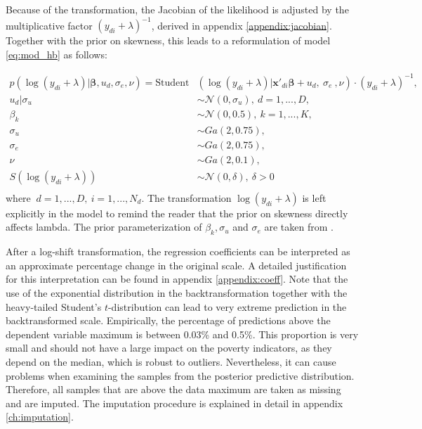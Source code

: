 Because of the transformation, the Jacobian of the likelihood is adjusted by the multiplicative factor $(y_{di} + \lambda)^{-1}$, derived in appendix \ref{appendix:jacobian}. Together with the prior on skewness, this leads to a reformulation of model \ref{eq:mod_hb} as follows:

\begin{equation}
    \begin{split}
        p(\log(y_{di} + \lambda) |\boldsymbol \beta, u_d, \sigma_e, \nu)   =        \text{Student}&(\log(y_{di} + \lambda)| \boldsymbol{x'}_{di} \boldsymbol \beta + u_d,\ \sigma_e\ , \nu)\cdot (y_{di} + \lambda)^{-1}, \\
        u_d | \sigma_u & \sim \mathcal N(0, \sigma_u),\ d = 1, ..., D, \\
        \beta_k & \sim \mathcal N(0, 0.5),\ k = 1, ..., K,\\
        \sigma_u & \sim Ga(2, 0.75), \\
        \sigma_e & \sim Ga(2, 0.75), \\
        \nu & \sim Ga(2, 0.1), \\
        S(\log(y_{di} + \lambda)) & \sim \mathcal N(0, \delta), ~ \delta > 0\\
    \end{split}
    \label{eq:trafo_hb}
\end{equation}
where $\ d = 1, ..., D,\ i = 1, ..., N_d$. The transformation $\log(y_{di} + \lambda)$ is left explicitly in the model to remind the reader that the prior on skewness directly affects lambda.
The prior parameterization of $\beta_k, \sigma_u$ and $\sigma_e$ are taken from \cite{morelli_hierarchical_2021}.

After a log-shift transformation, the regression coefficients can be interpreted as an approximate percentage change in the original scale.
A detailed justification for this interpretation can be found in appendix \ref{appendix:coeff}.
Note that the use of the exponential distribution in the backtransformation together with the heavy-tailed Student's $t$-distribution can lead to very extreme prediction in the backtransformed scale.
Empirically, the percentage of predictions above the dependent variable maximum is between 0.03\% and 0.5\%.
This proportion is very small and should not have a large impact on the poverty indicators, as they depend on the median, which is robust to outliers.
Nevertheless, it can cause problems when examining the samples from the posterior predictive distribution.
Therefore, all samples that are above the data maximum are taken as missing and are imputed.
The imputation procedure is explained in detail in appendix \ref{ch:imputation}.



